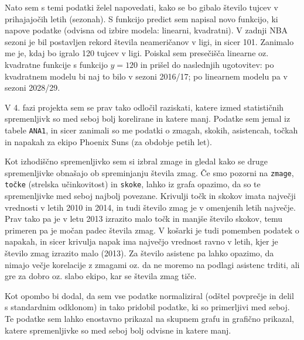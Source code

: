 \documentclass[11pt,a4paper]{article}
\begin{document}
\smallskip


Nato sem s temi podatki želel napovedati, kako se bo gibalo število tujcev v prihajajočih letih (sezonah). S funkcijo predict sem napisal novo funkcijo, ki napove podatke (odvisna od izbire modela: linearni, kvadratni). V zadnji NBA sezoni je bil postavljen rekord števila neameričanov v ligi, in sicer 101. Zanimalo me je, kdaj bo igralo 120 tujcev v ligi. Poiskal sem presečišča linearne oz. kvadratne funkcije s funkcijo $y = 120$ in prišel do naslednjih ugotovitev: po kvadratnem modelu bi naj to bilo v sezoni 2016/17;
po linearnem modelu pa v sezoni 2028/29.

\smallskip


\newpage
V 4. fazi projekta sem se prav tako odločil raziskati, katere izmed statističnih spremenljivk so med seboj bolj korelirane in katere manj. Podatke sem jemal iz tabele \verb|ANA1|, in sicer zanimali so me podatki o zmagah, skokih, asistencah, točkah in napakah za ekipo Phoenix Suns (za obdobje petih let).

\smallskip

\newpage
Kot izhodiščno spremenljivko sem si izbral zmage in gledal kako se druge spremenljivke obnašajo ob spreminjanju števila zmag. Če smo pozorni na \verb|zmage|, \verb|točke| (strelska učinkovitost) in \verb|skoke|, lahko iz grafa opazimo, da so te spremenljivke med seboj najbolj povezane. Krivulji točk in skokov imata največji vrednosti v letih 2010 in 2014, in tudi število zmag je v omenjenih letih največje. Prav tako pa je v letu 2013 izrazito malo točk in manjše število skokov, temu primeren pa je močan padec števila zmag. V košarki je tudi pomemben podatek o napakah, in sicer krivulja napak ima največjo vrednost ravno v letih, kjer je število zmag izrazito malo (2013). Za število asistenc pa lahko opazimo, da nimajo večje korelacije z zmagami oz. da ne moremo na podlagi asistenc trditi, ali gre za dobro oz. slabo ekipo, kar se števila zmag tiče.
\smallskip

Kot opombo bi dodal, da sem vse podatke normaliziral (odštel povprečje in delil s standardnim odklonom) in tako pridobil podatke, ki so primerljivi med seboj. Te podatke sem lahko enostavno prikazal na skupnem grafu in grafično prikazal, katere spremenljivke so med seboj bolj odvisne in katere manj.
\end{document}
